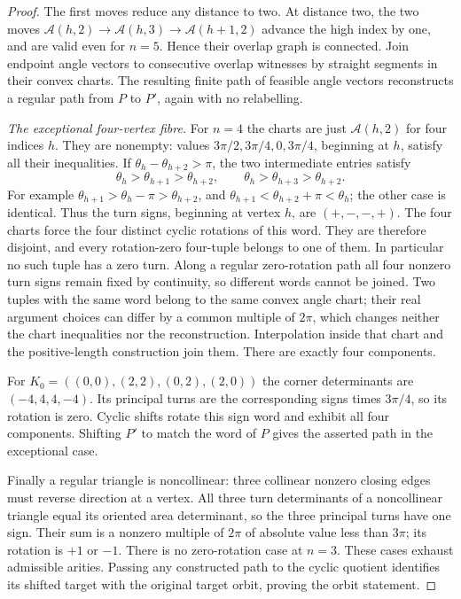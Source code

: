 \begin{proof}
The first moves reduce any distance to two. At distance two, the two moves
$\mathcal A(h,2)\to\mathcal A(h,3)\to\mathcal A(h+1,2)$ advance the high
index by one, and are valid even for $n=5$. Hence their overlap graph is
connected. Join endpoint angle vectors to consecutive overlap witnesses by
straight segments in their convex charts. The resulting finite path of
feasible angle vectors reconstructs a regular path from $P$ to $P'$, again
with no relabelling.

\emph{The exceptional four-vertex fibre.}
For $n=4$ the charts are just $\mathcal A(h,2)$ for four indices $h$.
They are nonempty: values $3\pi/2,3\pi/4,0,3\pi/4$, beginning at $h$,
satisfy all their inequalities. If $\theta_h-\theta_{h+2}>\pi$, the two
intermediate entries satisfy
\begin{equation}\label{transport:four-orders}
 \theta_h>\theta_{h+1}>\theta_{h+2},\qquad
 \theta_h>\theta_{h+3}>\theta_{h+2}.
\end{equation}
For example $\theta_{h+1}>\theta_h-\pi>\theta_{h+2}$, and
$\theta_{h+1}<\theta_{h+2}+\pi<\theta_h$; the other case is identical.
Thus the turn signs, beginning at vertex $h$, are $(+,-,-,+)$.
The four charts force the four distinct cyclic rotations of this word.
They are therefore disjoint, and every rotation-zero four-tuple belongs to
one of them. In particular no such tuple has a zero turn. Along a regular
zero-rotation path all four nonzero turn signs remain fixed by continuity,
so different words cannot be joined. Two tuples with the same word belong
to the same convex angle chart; their real argument choices can differ by
a common multiple of $2\pi$, which changes neither the chart inequalities
nor the reconstruction. Interpolation inside that chart and the positive-length
construction join them. There are exactly four components.

For $K_0=((0,0),(2,2),(0,2),(2,0))$ the corner determinants are
$(-4,4,4,-4)$. Its principal turns are the corresponding signs times
$3\pi/4$, so its rotation is zero. Cyclic shifts rotate this sign word and
exhibit all four components. Shifting $P'$ to match the word of $P$ gives
the asserted path in the exceptional case.

Finally a regular triangle is noncollinear: three collinear nonzero closing
edges must reverse direction at a vertex. All three turn determinants of a
noncollinear triangle equal its oriented area determinant, so the three
principal turns have one sign. Their sum is a nonzero multiple of $2\pi$
of absolute value less than $3\pi$; its rotation is $+1$ or $-1$.
There is no zero-rotation case at $n=3$. These cases exhaust admissible
arities. Passing any constructed path to the cyclic quotient identifies
its shifted target with the original target orbit, proving the orbit statement.
\end{proof}

